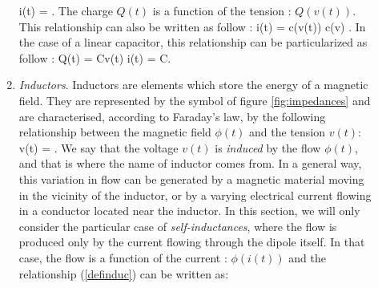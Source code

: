 \begin{description}
\begin{enumerate}
\eqnn
i(t) = .
\eeqnn
The charge $Q(t)$ is a function of the tension : $Q(v(t))$. This relationship can also be written as follow : 
\eqnn
i(t) = c(v(t))  \;\;
 \;\; c(v) \triangleq  {}.
\eeqnn
In the case of a linear capacitor, this relationship can be particularized as follow :
\eqnn
Q(t) = Cv(t) \;\;  \;\; i(t) = C.
\eeqnn
\item {\em Inductors}. Inductors are elements which store the energy of a magnetic field. They are represented by the symbol of figure \ref{fig:impedances} and are characterised, according to Faraday's law, by the following relationship between the magnetic field $\phi(t)$ and the tension $v(t)$:
\eqn
v(t) = . \label{definduc}
\eeqn
We say that the voltage $v(t)$ is {\it induced} by the flow $\phi(t)$, and that is where the name of inductor comes from. In a general way, this variation in flow can be generated by a magnetic material moving in the vicinity of the inductor, or by a varying electrical current flowing in a conductor located near the inductor. In this section, we will only consider the particular case of {\it self-inductances}, where the flow is produced only by the current flowing through the dipole itself. In that case, the flow is a function of the current : $\phi(i(t))$ and the relationship (\ref{definduc}) can be written as:

\end{enumerate}
\end{description}
